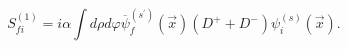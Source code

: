 \begin{equation}
S_{fi}^{\left( 1\right) }=i\alpha \int d\rho d\varphi
\overline{\psi}_{f}^{\left( s^{\prime }\right) }(\vec{x})
\left( D^{+}+D^{-}\right)
\psi_{i}^{\left( s\right) }(\vec{x}). %
\end{equation}

